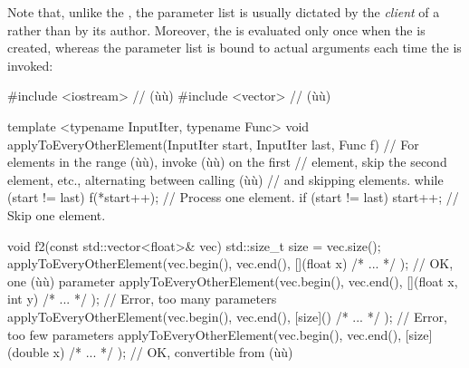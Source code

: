 Note that, unlike the , the parameter list is
usually dictated by the \emph{client} of a 
rather than by its author. Moreover, the  is
evaluated only once when the  is created, whereas the
parameter list is bound to actual arguments each time the  is invoked:

\begin{emcppslisting}[emcppserrorlines={22,24}]
#include <iostream>  // (ù{}ù)
#include <vector>    // (ù{}ù)

template <typename InputIter, typename Func>
void applyToEveryOtherElement(InputIter start, InputIter last, Func f)
    // For elements in the range (ù{\codeincomments{[start, last)}}ù), invoke (ù{}ù) on the first
    // element, skip the second element, etc., alternating between calling (ù{}ù)
    // and skipping elements.
{
    while (start != last)
    {
        f(*start++);                     // Process one element.
        if (start != last) { start++; }  // Skip one element.
    }
}

void f2(const std::vector<float>& vec)
{
    std::size_t size = vec.size();
    applyToEveryOtherElement(vec.begin(), vec.end(),
                [](float x){ /* ... */ });         // OK, one (ù{}ù) parameter
    applyToEveryOtherElement(vec.begin(), vec.end(),
                [](float x, int y){ /* ... */ });  // Error, too many parameters
    applyToEveryOtherElement(vec.begin(), vec.end(),
                [size](){ /* ... */ });            // Error, too few parameters
    applyToEveryOtherElement(vec.begin(), vec.end(),
                [size](double x){ /* ... */ });    // OK, convertible from (ù{}ù)
}
\end{emcppslisting}


